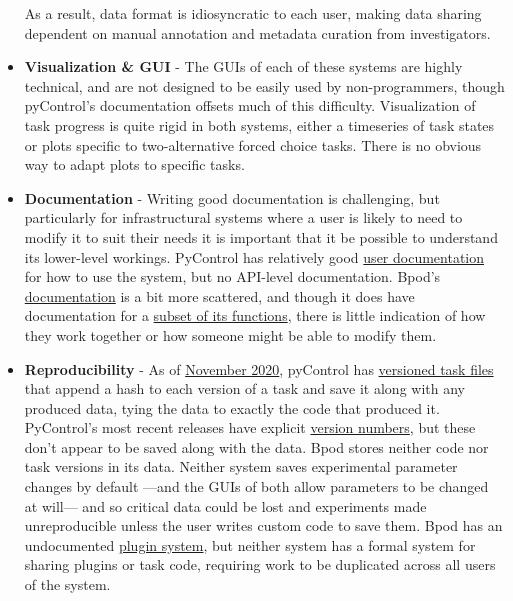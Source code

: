 \begin{itemize}[resume*, before=\vspace{0pt}, after=\vspace{\baselineskip}]
    As a result, data format is idiosyncratic to each user, making data sharing dependent on manual annotation and metadata curation from investigators. 
    \item \textbf{Visualization \& GUI} - The GUIs of each of these systems are highly technical, and are not designed to be easily used by non-programmers, though pyControl's documentation offsets much of this difficulty. Visualization of task progress is quite rigid in both systems, either a timeseries of task states or plots specific to two-alternative forced choice tasks. There is no obvious way to adapt plots to specific tasks.
    \item \textbf{Documentation} - Writing good documentation is challenging, but particularly for infrastructural systems where a user is likely to need to modify it to suit their needs it is important that it be possible to understand its lower-level workings. PyControl has relatively good \href{https://pycontrol.readthedocs.io/en/latest/}{user documentation} for how to use the system, but no API-level documentation. Bpod's \href{https://sites.google.com/site/bpoddocumentation/home}{documentation} is a bit more scattered, and though it does have documentation for a \href{https://sites.google.com/site/bpoddocumentation/user-guide/function-reference}{subset of its functions}, there is little indication of how they work together or how someone might be able to modify them.
    \item \textbf{Reproducibility} - As of \href{https://github.com/pyControl/code/blob/cc6e7ab67c18388dea85b3ac48ac66a65ffa12f8/ChangeLog.txt#L74}{November 2020}, pyControl has \href{https://pycontrol.readthedocs.io/en/latest/user-guide/pycontrol-data/#versioned-task-files}{versioned task files} that append a hash to each version of a task and save it along with any produced data, tying the data to exactly the code that produced it. PyControl's most recent releases have explicit \href{https://github.com/pyControl/code/releases}{version numbers}, but these don't appear to be saved along with the data. Bpod stores neither code nor task versions in its data. Neither system saves experimental parameter changes by default ---and the GUIs of both allow parameters to be changed at will--- and so critical data could be lost and experiments made unreproducible unless the user writes custom code to save them. Bpod has an undocumented \href{https://github.com/sanworks/Bpod_Gen2/commit/10ad997555086afb93dfc1080091acaa58d740f9}{plugin system}, but neither system has a formal system for sharing plugins or task code, requiring work to be duplicated across all users of the system.

\end{itemize}
